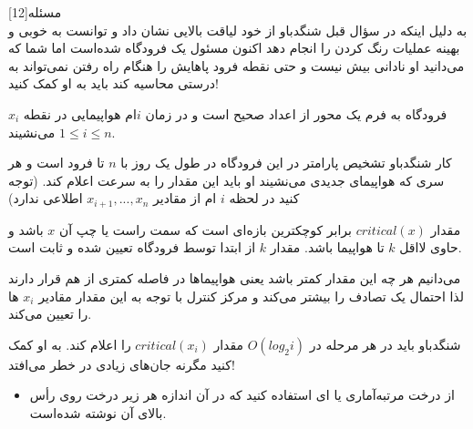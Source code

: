 ‌مسئله[12]  
\\
به دلیل اینکه در سؤال قبل شنگدباو از خود لیاقت بالایی نشان داد و توانست به خوبی و بهینه عملیات رنگ کردن را انجام دهد اکنون مسئول یک فرود‌گاه شده‌است اما شما که می‌دانید او نادانی بیش نیست و حتی نقطه فرود پاهایش را هنگام راه رفتن نمی‌تواند به درستی محاسیه کند باید به او کمک کنید!

فرودگاه 
به فرم یک محور از اعداد صحیح است و در زمان $i$ام هواپیمایی در نقطه $x_i$ می‌نشیند $1 \le i \le n$.

کار شنگدباو تشخیص پارامتر
در این فرودگاه در طول یک روز با $n$ تا فرود است و هر سری که هواپیمای جدیدی می‌نشیند او باید این مقدار را به سرعت اعلام کند. (توجه کنید در لحظه $i$ ام از مقادیر 
$x_{i+1}, ..., x_{n}$
اطلاعی ندارد)

مقدار
$critical(x)$
برابر کوچکترین بازه‌ای است که سمت راست یا چپ آن $x$ باشد و حاوی لااقل $k$ تا هواپیما باشد. مقدار $k$ از ابتدا توسط فرود‌گاه تعیین شده و ثابت است.

می‌دانیم هر چه این مقدار کمتر باشد یعنی هواپیما‌ها در فاصله کمتری از هم قرار دارند لذا احتمال یک تصادف را بیشتر می‌کند و مرکز کنترل با توجه به این مقدار مقادیر $x_i$ ها را تعیین می‌کند.

شنگدباو باید در هر مرحله در
$O(log_{2}i)$
مقدار 
$critical(x_i)$
را اعلام کند. به او کمک کنید مگرنه جان‌های زیادی در خطر می‌افتد!

\begin{itemize}
	\item [راهنمایی: ]
	از درخت مرتبه‌آماری یا 
	ای استفاده کنید که در آن اندازه هر زیر درخت روی رأس بالای آن نوشته شده‌است.
\end{itemize}

